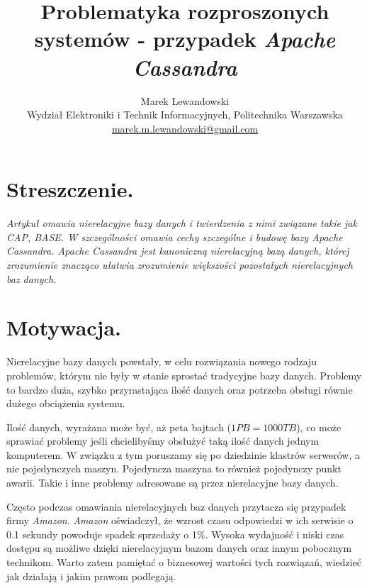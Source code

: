 \documentclass[oneside, 11pt, a4paper]{article}
\title{\vspace{15mm}\fontsize{14pt}{10pt}\selectfont\textbf{Problematyka rozproszonych systemów - przypadek \emph{Apache Cassandra}}} %
\author{
{\fontsize{12pt}{1.2em}\selectfont Marek Lewandowski} \\
{\fontsize{11pt}{1.2em}\selectfont Wydział Elektroniki i Technik Informacyjnych, Politechnika Warszawska} \\
{\fontsize{11pt}{1.2em}\selectfont \href{mailto:marek.m.lewandowski@gmail.com}{marek.m.lewandowski@gmail.com}} 
\date{}
}
\renewenvironment{abstract}
               {\list{}{}%
                \item[\textbf{Streszczenie.}]\relax}
               {\endlist}
\begin{document}
\maketitle %

\thispagestyle{fancy} %





\begin{multicols}{2} %

\section*{Streszczenie.}

\textit{
Artykuł omawia nierelacyjne bazy danych i twierdzenia z nimi związane takie jak \emph{CAP, BASE}. W szczególności omawia cechy szczególne i budowę bazy \emph{Apache Cassandra}. \emph{Apache Cassandra} jest kanoniczną nierelacyjną bazą danych, której zrozumienie znacząco ułatwia zrozumienie większości pozostałych nierelacyjnych baz danych.
}

\section{Motywacja.}
Nierelacyjne bazy danych powstały, w celu rozwiązania nowego rodzaju problemów, którym nie były w stanie sprostać tradycyjne bazy danych. Problemy to bardzo duża, szybko przyrastająca ilość danych oraz potrzeba obsługi równie dużego obciążenia systemu.

Ilość danych, wyrażana może być, aż peta bajtach ($1PB=1000 TB$), co może sprawiać problemy jeśli chcielibyśmy obsłużyć taką ilość danych jednym komputerem. W związku z tym poruszamy się po dziedzinie klastrów serwerów, a nie pojedynczych maszyn. Pojedyncza maszyna to również pojedynczy punkt awarii. Takie i inne problemy adresowane są przez nierelacyjne bazy danych.

Często podczas omawiania nierelacyjnych baz danych przytacza się przypadek firmy \emph{Amazon}. \emph{Amazon} oświadczył, że wzrost czasu odpowiedzi w ich serwisie o 0.1 sekundy powoduje spadek sprzedaży o 1\%. Wysoka wydajność i niski czas dostępu są możliwe dzięki nierelacyjnym bazom danych oraz innym pobocznym technikom. Warto zatem pamiętać o biznesowej wartości tych rozwiązań, wiedzieć jak działają i jakim prawom podlegają.


\end{multicols}
\end{document}
